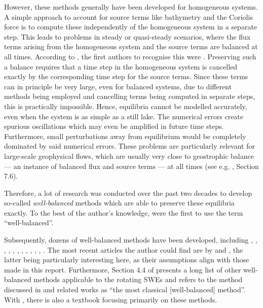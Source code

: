 However, these methods generally have been developed for homogeneous systems. A simple approach to account for source terms like bathymetry and the Coriolis force is to compute these independently of the homogeneous system in a separate step. This leads to problems in steady or quasi-steady scenarios, where the flux terms arising from the homogeneous system and the source terms are balanced at all times. According to \citet{toro2007godunov}, the first authors to recognise this were \citet{glimm1984generalized}. Preserving such a balance requires that a time step in the homogeneous system is  cancelled exactly by the corresponding time step for the source terms. Since these terms can in principle be very large, even for balanced systems, due to different methods being employed and cancelling terms being computed in separate steps, this is practically impossible. Hence, equilibria cannot be modelled accurately, even when the system is as simple as a still lake. The numerical errors create spurious oscillations which may even be amplified in future time steps. Furthermore, small perturbations away from equilibrium would be completely dominated by said numerical errors. These problems are particularly relevant for large-scale geophysical flows, which are usually very close to geostrophic balance --- an instance of balanced flux and source terms --- at all times (see e.g. \citet{gill1982atmosphere}, Section 7.6).

Therefore, a lot of research was conducted over the past two decades to develop so-called \emph{well-balanced} methods which are able to preserve these equilibria exactly. To the best of the author's knowledge, \citet{greenberg1996well} were the first to use the term ``well-balanced''.

Subsequently, dozens of well-balanced methods have been developed, including \citet{leveque1998balancing}, \citet{garcia2000numerical}, \citet{hubbard2000flux}, \citet{burguete2001efficient}, \citet{gascon2001construction}, \citet{rogers2001adaptive}, \citet{bale2003wave}, \citet{rogers2003mathematical}, \citet{audusse2004fast}, \citet{chinnayya2004well}, \citet{liang2009adaptive}, \citet{liang2009numerical}. The most recent articles the author could find are by \citet{zhang2014well} and \citet{chertockwell}, the latter being particularly interesting here, as their assumptions align with those made in this report. Furthermore, Section 4.4 of \citet{zeitlin2007nonlinear} presents a long list of other well-balanced methods applicable to the rotating SWEs and refers to the method discussed in \citet{audusse2004fast} and related works as ``the most classical [well-balanced] method''. With \citet{bouchut2004nonlinear}, there is also a textbook focusing primarily on these methods.


